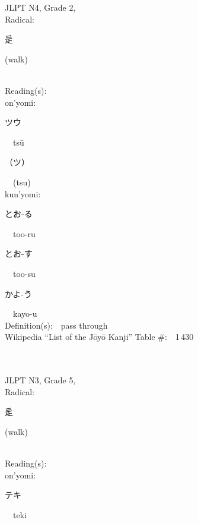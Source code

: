 \begin{multicols}{2}
{JLPT N4, Grade 2, \\Radical:\ \ {\begin{CJK}{UTF8}{min} 辵 \end{CJK}} (walk) } \\
Reading(s):\ \ \\
{\hspace*{1em}}on'yomi:\ \ \\
{\hspace*{2em}}{\begin{CJK}{UTF8}{min} ツウ \end{CJK}}\ \ ts\=u\ \ \\
{\hspace*{2em}}{\begin{CJK}{UTF8}{min} （ツ） \end{CJK}}\ \ (tsu)\ \ \\
{\hspace*{1em}}kun'yomi:\ \ \\
{\hspace*{2em}}{\begin{CJK}{UTF8}{min} とお-る \end{CJK}}\ \ too-ru\ \ \\
{\hspace*{2em}}{\begin{CJK}{UTF8}{min} とお-す \end{CJK}}\ \ too-su\ \ \\
{\hspace*{2em}}{\begin{CJK}{UTF8}{min} かよ-う \end{CJK}}\ \ kayo-u\ \ \\
Definition(s):\ \ pass through \\
Wikipedia ``List of the J\=oy\=o Kanji'' Table \#:\ \ 1\,430 \\
\ \ \\
{\fontsize{34pt}{40pt}  }\ \ \\  %
{JLPT N3, Grade 5, \\Radical:\ \ {\begin{CJK}{UTF8}{min} 辵 \end{CJK}} (walk) } \\
Reading(s):\ \ \\
{\hspace*{1em}}on'yomi:\ \ \\
{\hspace*{2em}}{\begin{CJK}{UTF8}{min} テキ \end{CJK}}\ \ teki\ \ \\

\end{multicols}

